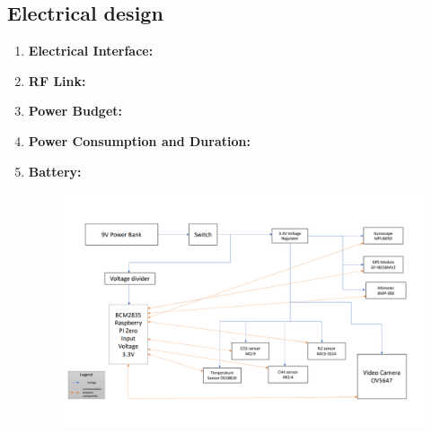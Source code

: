 \documentclass[11pt]{article}
\begin{document}
\subsection{Electrical design}
\begin{enumerate}
\item \textbf{Electrical Interface:}
\item \textbf{RF Link:}
\item \textbf{Power Budget:}
\item \textbf{Power Consumption and Duration:}
\item \textbf{Battery:} 

\begin{figure}[h]
\includegraphics[width=15cm]{Schema_electrica}
\centering
\end{figure}
\end{enumerate}
\end{document}
